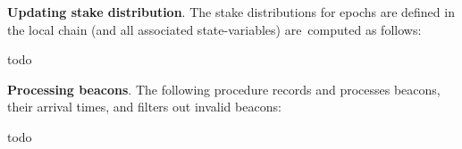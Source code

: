 \bigbreak
\bigbreak
\noindent
{}
\textbf{Updating stake distribution}.\label{apndx:upd-stake}
The stake distributions for epochs are defined in the local chain (and all associated state-variables) are\
computed as follows:
\begin{protocol}
    \caption{$\textsf{UpdateStakeDistribution}(P, \text{sid}, R, \mathcal{C}_{\text{loc}}, \{S_k^{\text{id}}\}_{k=1}^K, \{f^{\text{cons}}_k\}_{k=1}^K)$}
    \begin{algorithmic}[1]

        todo
    \end{algorithmic}\label{alg:upd-stake}
\end{protocol}


\bigbreak
\bigbreak
\noindent
{}
\textbf{Processing beacons}.\label{apndx:proc-beacons}
The following procedure records and processes beacons, their arrival times, and filters out invalid beacons:
\begin{protocol}
    \caption{$\textsf{ProcessBeacons}(P, \text{sid}, R, \{b^{\text{sync}}_n\}_{n=1}^N, \mathcal{C})$}
    \begin{algorithmic}[1]

        todo
    \end{algorithmic}\label{alg:proc-beacons}
\end{protocol}

